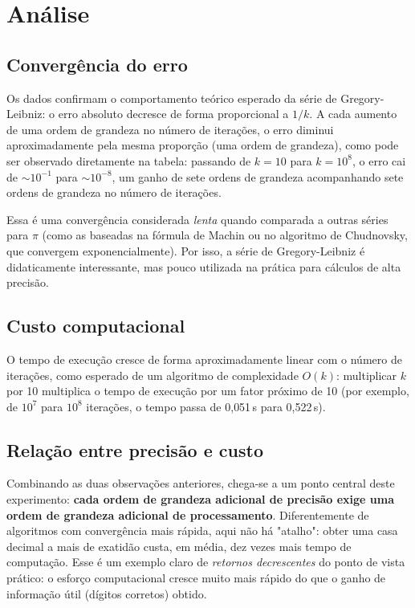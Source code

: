 \documentclass[a4paper,12pt]{article}
\begin{document}
\section{Análise}

\subsection{Convergência do erro}

Os dados confirmam o comportamento teórico esperado da série de Gregory-Leibniz:
o erro absoluto decresce de forma proporcional a $1/k$. A cada aumento de uma
ordem de grandeza no número de iterações, o erro diminui aproximadamente pela
mesma proporção (uma ordem de grandeza), como pode ser observado diretamente na
tabela: passando de $k=10$ para $k=10^8$, o erro cai de $\sim 10^{-1}$ para
$\sim 10^{-8}$, um ganho de sete ordens de grandeza acompanhando sete ordens de
grandeza no número de iterações.

Essa é uma convergência considerada \emph{lenta} quando comparada a outras
séries para $\pi$ (como as baseadas na fórmula de Machin ou no algoritmo de
Chudnovsky, que convergem exponencialmente). Por isso, a série de
Gregory-Leibniz é didaticamente interessante, mas pouco utilizada na prática
para cálculos de alta precisão.

\subsection{Custo computacional}

O tempo de execução cresce de forma aproximadamente linear com o número de
iterações, como esperado de um algoritmo de complexidade $O(k)$: multiplicar
$k$ por 10 multiplica o tempo de execução por um fator próximo de 10 (por
exemplo, de $10^7$ para $10^8$ iterações, o tempo passa de 0{,}051\,s para
0{,}522\,s).

\subsection{Relação entre precisão e custo}

Combinando as duas observações anteriores, chega-se a um ponto central deste
experimento: \textbf{cada ordem de grandeza adicional de precisão exige uma
ordem de grandeza adicional de processamento}. Diferentemente de algoritmos com
convergência mais rápida, aqui não há "atalho": obter uma casa decimal a mais
de exatidão custa, em média, dez vezes mais tempo de computação. Esse é um
exemplo claro de \emph{retornos decrescentes} do ponto de vista prático: o
esforço computacional cresce muito mais rápido do que o ganho de informação
útil (dígitos corretos) obtido.
\end{document}
